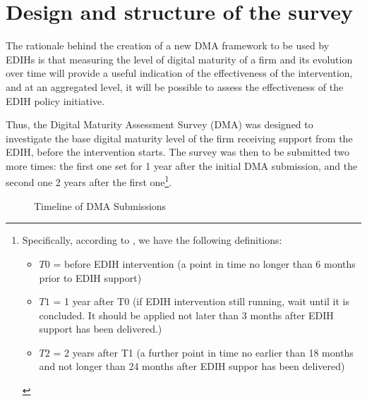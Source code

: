 \documentclass[12pt]{report}
\begin{document}
\section{Design and structure of the survey}

\par The rationale behind the creation of a new DMA framework to be used by EDIHs is that measuring the level of digital maturity of a firm and its evolution over time will provide a useful indication of the effectiveness of the intervention, and at an aggregated level, it will be possible to assess the effectiveness of the EDIH policy initiative.

\par Thus, the Digital Maturity Assessment Survey (DMA) was designed to investigate the base digital maturity level of the firm receiving support from the EDIH, before the intervention starts. The survey was then to be submitted two more times: the first one set for 1 year after the initial DMA submission, and the second one 2 years after the first one\footnote{Specifically, according to \cite{jrc_dmamanual}, we have the following definitions:
\begin{itemize}
   \item $T0$ = before EDIH intervention (a point in time no longer than 6 months prior to EDIH support)
   \item $T1$ = 1 year after T0 (if EDIH intervention still running, wait until it is concluded. It should be applied not later than 3 months after EDIH support has been delivered.)
   \item $T2$ = 2 years after T1 (a further point in time no earlier than 18 months and not longer than 24 months after EDIH suppor has been delivered)   
\end{itemize}}.

\begin{figure}[ht]
    \centering
    \caption{Timeline of DMA Submissions}
    \label{fig:timeline}
\end{figure}
\end{document}
